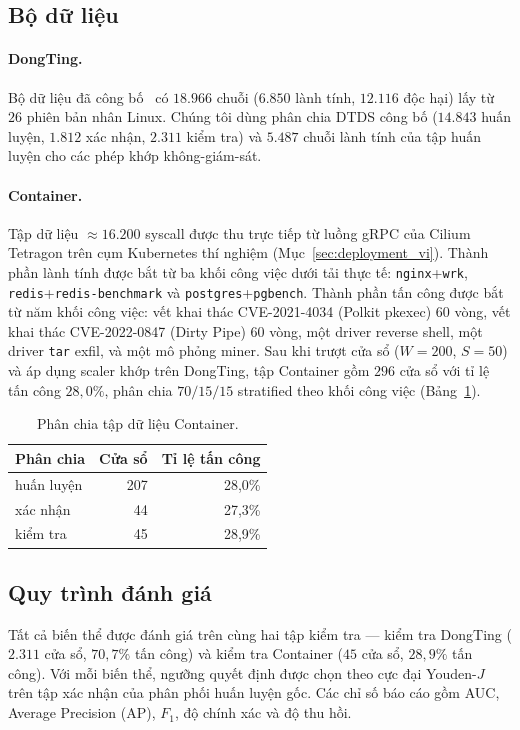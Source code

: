 \subsection{Bộ dữ liệu}
\label{subsec:datasets_vi}

\paragraph{DongTing.}
Bộ dữ liệu đã công bố~\cite{dongting} có $18.966$ chuỗi ($6.850$ lành
tính, $12.116$ độc hại) lấy từ $26$ phiên bản nhân Linux. Chúng tôi
dùng phân chia DTDS công bố ($14.843$ huấn luyện, $1.812$ xác nhận,
$2.311$ kiểm tra) và $5.487$ chuỗi lành tính của tập huấn luyện cho
các phép khớp không-giám-sát.

\paragraph{Container.}
Tập dữ liệu $\approx\!16.200$ syscall được thu trực tiếp từ luồng gRPC
của Cilium Tetragon trên cụm Kubernetes thí nghiệm
(Mục~\ref{sec:deployment_vi}). Thành phần lành tính được bắt từ ba
khối công việc dưới tải thực tế: \texttt{nginx}+\texttt{wrk},
\texttt{redis}+\texttt{redis-benchmark} và
\texttt{postgres}+\texttt{pgbench}. Thành phần tấn công được bắt từ
năm khối công việc: vết khai thác CVE-2021-4034 (Polkit pkexec) $60$
vòng, vết khai thác CVE-2022-0847 (Dirty Pipe) $60$ vòng, một driver
reverse shell, một driver \texttt{tar} exfil, và một mô phỏng miner.
Sau khi trượt cửa sổ ($W=200$, $S=50$) và áp dụng scaler khớp trên
DongTing, tập Container gồm $296$ cửa sổ với tỉ lệ tấn công $28{,}0\%$,
phân chia $70/15/15$ stratified theo khối công việc
(Bảng~\ref{tab:dataset_summary_vi}).

\begin{table}[!t]
\centering
\caption{Phân chia tập dữ liệu Container.}
\label{tab:dataset_summary_vi}
\begin{tabular}{lrr}
\toprule
Phân chia & Cửa sổ & Tỉ lệ tấn công \\
\midrule
huấn luyện  & 207  & 28,0\% \\
xác nhận    & 44   & 27,3\% \\
kiểm tra    & 45   & 28,9\% \\
\bottomrule
\end{tabular}
\end{table}

\subsection{Quy trình đánh giá}
Tất cả biến thể được đánh giá trên cùng hai tập kiểm tra --- kiểm tra
DongTing ($2.311$ cửa sổ, $70{,}7\%$ tấn công) và kiểm tra Container
($45$ cửa sổ, $28{,}9\%$ tấn công). Với mỗi biến thể, ngưỡng quyết
định được chọn theo cực đại Youden-$J$ trên tập xác nhận của phân
phối huấn luyện gốc. Các chỉ số báo cáo gồm AUC, Average Precision
(AP), $F_{1}$, độ chính xác và độ thu hồi.

